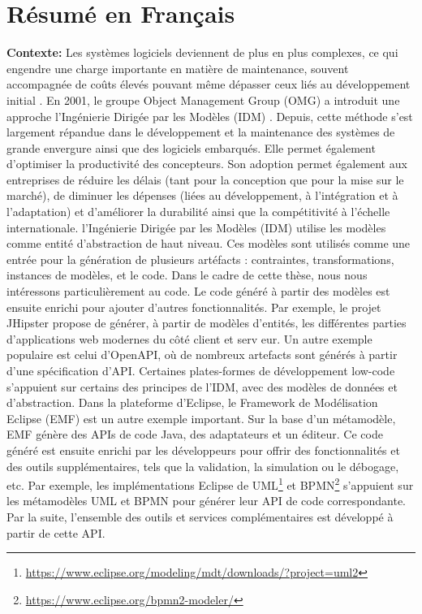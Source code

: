 \chapter*{Résumé en Français}
\textbf{Contexte:} Les systèmes logiciels deviennent de plus en plus complexes, ce qui engendre une charge importante en matière de maintenance, souvent accompagnée de coûts élevés pouvant même dépasser ceux liés au développement initial \cite{https://doi.org/10.1049/sfw2.12075}.
 En 2001, le groupe Object Management Group (OMG) a introduit une approche l’Ingénierie Dirigée par les Modèles (IDM) \cite{brambilla2017model}. Depuis, cette méthode s’est largement répandue dans le développement et la maintenance des systèmes de grande envergure ainsi que des logiciels embarqués. Elle permet également d’optimiser la productivité des concepteurs.
 Son adoption permet également aux entreprises de réduire les délais (tant pour la conception que pour la mise sur le marché), de diminuer les dépenses (liées au développement, à l’intégration et à l’adaptation) et d’améliorer la durabilité ainsi que la compétitivité à l’échelle internationale.
l’Ingénierie Dirigée par les Modèles (IDM) utilise les modèles comme entité d'abstraction de haut niveau. Ces modèles sont utilisés comme une entrée pour la génération de plusieurs artéfacts : contraintes, transformations, instances de modèles, et le code. Dans le cadre de cette thèse, nous nous intéressons particulièrement au code. 
Le code généré à partir des modèles est ensuite enrichi pour ajouter d'autres fonctionnalités. Par exemple, le projet JHipster propose de générer, à partir de modèles d'entités, les différentes parties d'applications web modernes du côté client et serv eur. Un autre exemple populaire est celui d'OpenAPI, où de nombreux artefacts sont générés à partir d'une spécification d'API. Certaines plates-formes de développement low-code s'appuient sur certains des principes de l'IDM, avec des modèles de données et d'abstraction. Dans la plateforme d’Eclipse, le Framework de Modélisation Eclipse (EMF) est un autre exemple important. Sur la base d'un métamodèle, EMF génère des APIs de code Java, des adaptateurs et un éditeur. Ce code généré est ensuite enrichi par les développeurs pour offrir des fonctionnalités et des outils supplémentaires, tels que la validation, la simulation ou le débogage, etc. Par exemple, les implémentations Eclipse de UML\footnote{\url{https://www.eclipse.org/modeling/mdt/downloads/?project=uml2}} et BPMN\footnote{\url{https://www.eclipse.org/bpmn2-modeler/}} s’appuient sur les métamodèles UML et BPMN pour générer leur API de code correspondante. Par la suite, l’ensemble des outils et services complémentaires est développé à partir de cette API.

